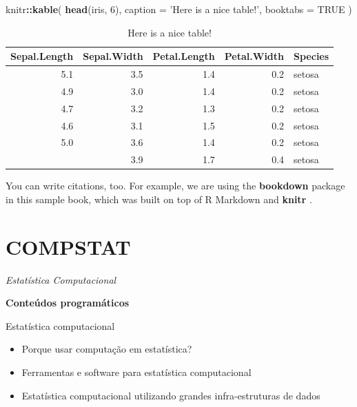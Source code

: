 \documentclass[]{book}
\newenvironment{Shaded}{\begin{snugshade}}{\end{snugshade}}
\newcommand{\DataTypeTok}[1]{\textcolor[rgb]{0.13,0.29,0.53}{#1}}
\newcommand{\DecValTok}[1]{\textcolor[rgb]{0.00,0.00,0.81}{#1}}
\newcommand{\KeywordTok}[1]{\textcolor[rgb]{0.13,0.29,0.53}{\textbf{#1}}}
\newcommand{\NormalTok}[1]{#1}
\newcommand{\OperatorTok}[1]{\textcolor[rgb]{0.81,0.36,0.00}{\textbf{#1}}}
\newcommand{\OtherTok}[1]{\textcolor[rgb]{0.56,0.35,0.01}{#1}}
\newcommand{\StringTok}[1]{\textcolor[rgb]{0.31,0.60,0.02}{#1}}
\providecommand{\tightlist}{%
  \setlength{\itemsep}{0pt}\setlength{\parskip}{0pt}}
\begin{document}
\begin{Shaded}
\begin{Highlighting}[]
\NormalTok{knitr}\OperatorTok{::}\KeywordTok{kable}\NormalTok{(}
  \KeywordTok{head}\NormalTok{(iris, }\DecValTok{6}\NormalTok{), }\DataTypeTok{caption =} \StringTok{'Here is a nice table!'}\NormalTok{,}
  \DataTypeTok{booktabs =} \OtherTok{TRUE}
\NormalTok{)}
\end{Highlighting}
\end{Shaded}

\begin{table}

\caption{\label{tab:nice-tab}Here is a nice table!}
\centering
\begin{tabular}[t]{rrrrl}
\toprule
Sepal.Length & Sepal.Width & Petal.Length & Petal.Width & Species\\
\midrule
5.1 & 3.5 & 1.4 & 0.2 & setosa\\
4.9 & 3.0 & 1.4 & 0.2 & setosa\\
4.7 & 3.2 & 1.3 & 0.2 & setosa\\
4.6 & 3.1 & 1.5 & 0.2 & setosa\\
5.0 & 3.6 & 1.4 & 0.2 & setosa\\
\addlinespace
5.4 & 3.9 & 1.7 & 0.4 & setosa\\
\bottomrule
\end{tabular}
\end{table}

You can write citations, too. For example, we are using the \textbf{bookdown} package \citep{R-bookdown} in this sample book, which was built on top of R Markdown and \textbf{knitr} \citep{xie2015}.

\hypertarget{compstat}{%
\chapter{COMPSTAT}\label{compstat}}

\emph{Estatística Computacional}

\textbf{Conteúdos programáticos}

Estatística computacional

\begin{itemize}
\tightlist
\item
  Porque usar computação em estatística?
\item
  Ferramentas e software para estatística computacional
\item
  Estatística computacional utilizando grandes infra-estruturas de dados
\end{itemize}
\end{document}
